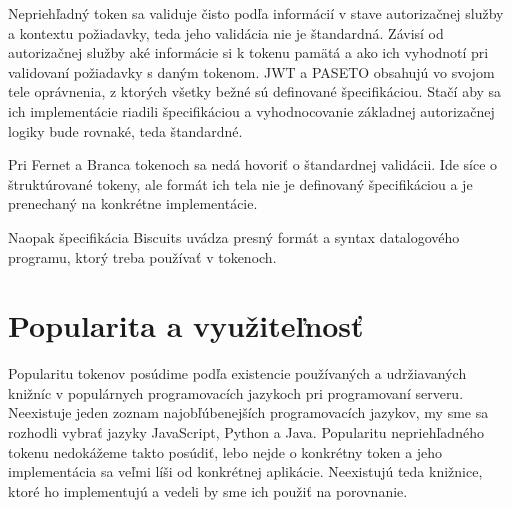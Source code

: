 Nepriehľadný token sa validuje čisto podľa informácií v stave autorizačnej služby a kontextu požiadavky, teda jeho validácia nie je štandardná. Závisí od autorizačnej služby aké informácie si k tokenu pamätá a ako ich vyhodnotí pri validovaní požiadavky s daným tokenom. JWT a PASETO obsahujú vo svojom tele oprávnenia, z ktorých všetky bežné sú definované špecifikáciou. Stačí aby sa ich implementácie riadili špecifikáciou a vyhodnocovanie základnej autorizačnej logiky bude rovnaké, teda štandardné.

Pri Fernet a Branca tokenoch sa nedá hovoriť o štandardnej validácii. Ide síce o štruktúrované tokeny, ale formát ich tela nie je definovaný špecifikáciou a je prenechaný na konkrétne implementácie.

Naopak špecifikácia Biscuits uvádza presný formát a syntax datalogového programu, ktorý treba používať v tokenoch.

\section{Popularita a využiteľnosť}

Popularitu tokenov posúdime podľa existencie používaných a udržiavaných knižníc v populárnych programovacích jazykoch pri programovaní serveru. Neexistuje jeden zoznam najobľúbenejších programovacích jazykov, my sme sa rozhodli vybrať jazyky JavaScript, Python a Java. Popularitu nepriehľadného tokenu nedokážeme takto posúdiť, lebo nejde o konkrétny token a jeho implementácia sa veľmi líši od konkrétnej aplikácie. Neexistujú teda knižnice, ktoré ho implementujú a vedeli by sme ich použiť na porovnanie.


